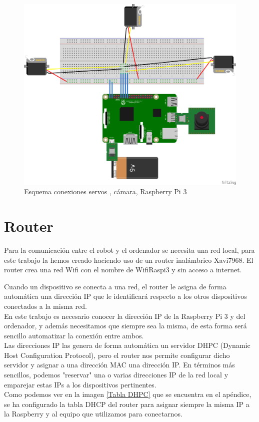\documentclass[twoside, 11pt]{epstfg}
\begin{document}
\begin{figure}[H]
	\centerline{
		\mbox{\includegraphics[width=.95\textwidth]{images/EsquemaServos.png}}
	}
	\caption{Esquema conexiones servos , cámara, Raspberry Pi 3}
	\label{Figura conexiones robot}
\end{figure}


\section{Router}
Para la comunicación entre el robot y el ordenador se necesita una red local,  para este trabajo la hemos creado haciendo uso de un router inalámbrico Xavi7968.
El router crea una red Wifi con el nombre de WifiRaspi3 y sin acceso a internet.

Cuando un dispositivo se conecta a una red, el router le asigna de forma automática una dirección IP que le identificará respecto a los otros dispositivos conectados a la misma red.\\
En este trabajo es necesario conocer la dirección IP de la Raspberry Pi 3 y del ordenador, y además necesitamos que siempre sea la misma, de esta forma será sencillo automatizar la conexión entre ambos.\\
Las direcciones IP las genera de forma automática un servidor DHPC (Dynamic Host Configuration Protocol), pero el router nos permite configurar dicho servidor y asignar a una dirección MAC una dirección IP. En términos más sencillos, podemos "reservar" una o varias direcciones IP de la red local y emparejar estas IPs a los dispositivos pertinentes.\\
Como podemos ver en la imagen \ref{Tabla DHPC} que se encuentra en el apéndice, se ha configurado la tabla DHCP del router para asignar siempre la misma IP a la Raspberry y al equipo que utilizamos para conectarnos.
\end{document}
